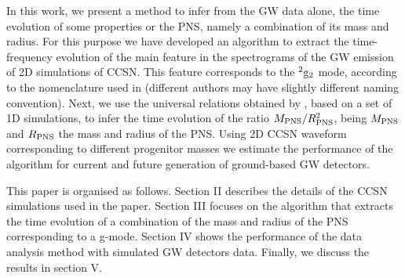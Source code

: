 {In this work, we present a method to infer from the GW data alone, the time evolution of some properties or the PNS, namely a combination of its mass and radius. For this purpose we have developed an algorithm to  
extract the time-frequency evolution of the main feature in the spectrograms of the GW emission of 2D simulations of CCSN. This feature corresponds to the $^2\rm{g}_2$ mode, according to the nomenclature used in \cite{Torres:2019b} (different authors may have slightly different naming convention). Next, we use the universal relations obtained by \cite{Torres:2019b}{, based on a set of 1D simulations,} to infer the time evolution of the ratio $M_{\rm PNS}/R_{\rm PNS}^2$, being 
$M_{\rm PNS}$ and $R_{\rm PNS}$ the mass and radius of the PNS.} Using 2D CCSN waveform corresponding to different progenitor masses we estimate the performance of the algorithm for current and future generation of ground-based GW detectors.

This paper is organised as follows. Section II describes the details of the CCSN simulations used in the paper. Section III focuses on the algorithm that extracts the time evolution of a combination of the mass and radius of the PNS corresponding to a g-mode. Section IV shows the performance of the data analysis method with simulated GW detectors data. Finally, we discuss the results in section V.


